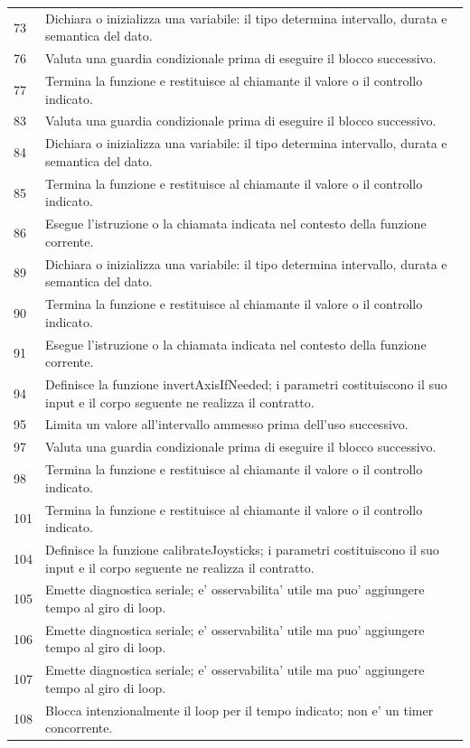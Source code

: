 \documentclass[11pt,a4paper]{article}
\begin{document}
\begin{longtable}{p{}p{}}
73 & Dichiara o inizializza una variabile: il tipo determina intervallo, durata e semantica del dato. \\
76 & Valuta una guardia condizionale prima di eseguire il blocco successivo. \\
77 & Termina la funzione e restituisce al chiamante il valore o il controllo indicato. \\
83 & Valuta una guardia condizionale prima di eseguire il blocco successivo. \\
84 & Dichiara o inizializza una variabile: il tipo determina intervallo, durata e semantica del dato. \\
85 & Termina la funzione e restituisce al chiamante il valore o il controllo indicato. \\
86 & Esegue l'istruzione o la chiamata indicata nel contesto della funzione corrente. \\
89 & Dichiara o inizializza una variabile: il tipo determina intervallo, durata e semantica del dato. \\
90 & Termina la funzione e restituisce al chiamante il valore o il controllo indicato. \\
91 & Esegue l'istruzione o la chiamata indicata nel contesto della funzione corrente. \\
94 & Definisce la funzione invertAxisIfNeeded; i parametri costituiscono il suo input e il corpo seguente ne realizza il contratto. \\
95 & Limita un valore all'intervallo ammesso prima dell'uso successivo. \\
97 & Valuta una guardia condizionale prima di eseguire il blocco successivo. \\
98 & Termina la funzione e restituisce al chiamante il valore o il controllo indicato. \\
101 & Termina la funzione e restituisce al chiamante il valore o il controllo indicato. \\
104 & Definisce la funzione calibrateJoysticks; i parametri costituiscono il suo input e il corpo seguente ne realizza il contratto. \\
105 & Emette diagnostica seriale; e' osservabilita' utile ma puo' aggiungere tempo al giro di loop. \\
106 & Emette diagnostica seriale; e' osservabilita' utile ma puo' aggiungere tempo al giro di loop. \\
107 & Emette diagnostica seriale; e' osservabilita' utile ma puo' aggiungere tempo al giro di loop. \\
108 & Blocca intenzionalmente il loop per il tempo indicato; non e' un timer concorrente. \\

\end{longtable}
\end{document}
